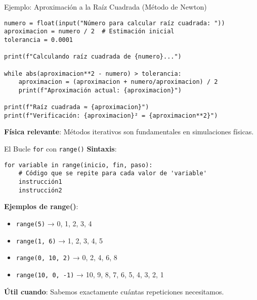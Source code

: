 \documentclass[10pt]{beamer}
\begin{document}
\begin{frame}[fragile]{Ejemplo: Aproximación a la Raíz Cuadrada (Método de Newton)}
\begin{verbatim}
numero = float(input("Número para calcular raíz cuadrada: "))
aproximacion = numero / 2  # Estimación inicial
tolerancia = 0.0001

print(f"Calculando raíz cuadrada de {numero}...")

while abs(aproximacion**2 - numero) > tolerancia:
    aproximacion = (aproximacion + numero/aproximacion) / 2
    print(f"Aproximación actual: {aproximacion}")

print(f"Raíz cuadrada ≈ {aproximacion}")
print(f"Verificación: {aproximacion}² = {aproximacion**2}")
\end{verbatim}

\textbf{Física relevante}: Métodos iterativos son fundamentales en simulaciones físicas.
\end{frame}

\begin{frame}[fragile]{El Bucle \texttt{for} con \texttt{range()}}
  \textbf{Sintaxis}:
  \begin{verbatim}
for variable in range(inicio, fin, paso):
    # Código que se repite para cada valor de 'variable'
    instrucción1
    instrucción2
  \end{verbatim}
  
  \textbf{Ejemplos de range()}:
  \begin{itemize}
    \item \texttt{range(5)} → 0, 1, 2, 3, 4
    \item \texttt{range(1, 6)} → 1, 2, 3, 4, 5
    \item \texttt{range(0, 10, 2)} → 0, 2, 4, 6, 8
    \item \texttt{range(10, 0, -1)} → 10, 9, 8, 7, 6, 5, 4, 3, 2, 1
  \end{itemize}
  
  \textbf{Útil cuando}: Sabemos exactamente cuántas repeticiones necesitamos.
\end{frame}
\end{document}
